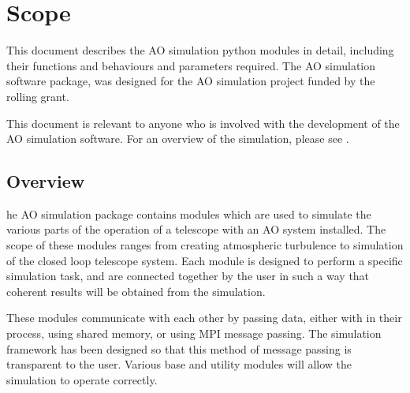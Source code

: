 \documentclass{article}
\begin{document}


\section{Scope}
This document describes the AO simulation python modules in detail,
including their functions and behaviours and parameters required.  The
AO simulation software package, was designed for the AO simulation
project funded by the rolling grant.  

This document is relevant to anyone who is involved with the
development of the AO simulation software.  For an overview of the
simulation, please see \citet{overview}.


\subsection{Overview}
he AO simulation package contains modules which are used to simulate
the various parts of the operation of a telescope with an AO system
installed.  The scope of these modules ranges from creating
atmospheric turbulence to simulation of the closed loop telescope
system.  Each module is designed to perform a specific simulation
task, and are connected together by the user in such a way that
coherent results will be obtained from the simulation.

These modules communicate with each other by passing data, either with
in their process, using shared memory, or using MPI message passing.
The simulation framework has been designed so that this method of
message passing is transparent to the user.  Various base and utility
modules will allow the simulation to operate correctly.




\printindex
\end{document}
